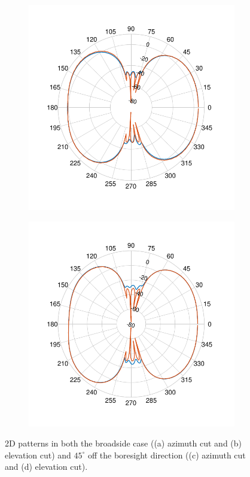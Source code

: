 \documentclass[10pt,a4paper,twocolumn]{article}
\begin{document}
{\begin{figure}[b!]
	\begin{subfigure}{0.25\linewidth}
		\includegraphics[scale=0.5]{pcb_pifa_array_azimuth_45_comparison.pdf}
		\caption{}
	\end{subfigure}
	\begin{subfigure}{0.25\linewidth}
		\includegraphics[scale=0.5]{pcb_pifa_array_elevation_45_comparison.pdf}
		\caption{}
	\end{subfigure}
	\caption{2D patterns in both the broadside case ((a) azimuth cut and (b) elevation cut) and $45^\circ$ off the boresight direction ((c) azimuth cut and (d) elevation cut).}
	\label{fig:pcb pifa array comparison}
\end{figure}
\clearpage
}
\end{document}

